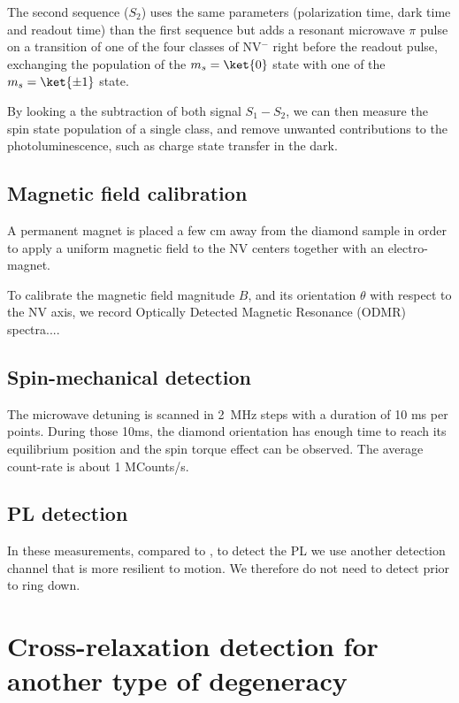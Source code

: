 \documentclass[preprintnumbers,amsmath,amssymb,onecolumn,12pt]{revtex4}
\begin{document}
The second sequence ($S_2$) uses the same parameters (polarization time, dark time and readout time) than the first sequence but adds a resonant microwave $\pi$ pulse on a transition of one of the four classes of NV$^-$ right before the readout pulse, exchanging the population of the $m_s=\ket{0}$ state with one of the $m_s=\ket{\pm 1}$ state.

By looking a the subtraction of both signal $S_1-S_2$, we can then measure the spin state population of a single class, and remove unwanted contributions to the photoluminescence, such as charge state transfer in the dark.

\subsection{Magnetic field calibration}

A permanent magnet is placed a few cm away from the diamond sample in order to apply a uniform magnetic field to the NV centers together with an electro-magnet.

To calibrate the magnetic field magnitude $B$, and its orientation $\theta$ with respect to the NV axis, we record Optically Detected Magnetic Resonance (ODMR) spectra.... 



\subsection{Spin-mechanical detection}

The microwave detuning is scanned in 2~MHz steps with a duration of 10 ms per points. During those 10ms, the diamond orientation has enough time to reach its equilibrium position and the spin torque effect can be observed. The average count-rate is about 1 MCounts/s.

\subsection{PL detection}

In these measurements, compared to \cite{DelordNat}, to detect the PL we use another detection channel that is more resilient to motion. We therefore do not need to detect prior to ring down.

\section{Cross-relaxation detection for another type of degeneracy}
\end{document}
